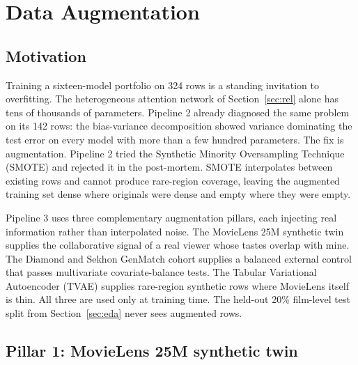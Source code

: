 \documentclass{article}
\begin{document}
\section{Data Augmentation}
\label{sec:aug}

\subsection{Motivation}

Training a sixteen-model portfolio on 324 rows is a standing invitation to overfitting. The heterogeneous attention network of Section~\ref{sec:rel} alone has tens of thousands of parameters. Pipeline 2 already diagnosed the same problem on its 142 rows: the bias-variance decomposition showed variance dominating the test error on every model with more than a few hundred parameters. The fix is augmentation. Pipeline 2 tried the Synthetic Minority Oversampling Technique (SMOTE) and rejected it in the post-mortem. SMOTE interpolates between existing rows and cannot produce rare-region coverage, leaving the augmented training set dense where originals were dense and empty where they were empty.

Pipeline 3 uses three complementary augmentation pillars, each injecting real information rather than interpolated noise. The MovieLens 25M synthetic twin supplies the collaborative signal of a real viewer whose tastes overlap with mine. The Diamond and Sekhon GenMatch cohort supplies a balanced external control that passes multivariate covariate-balance tests. The Tabular Variational Autoencoder (TVAE) supplies rare-region synthetic rows where MovieLens itself is thin. All three are used only at training time. The held-out 20\% film-level test split from Section~\ref{sec:eda} never sees augmented rows.

\subsection{Pillar 1: MovieLens 25M synthetic twin}
\end{document}
